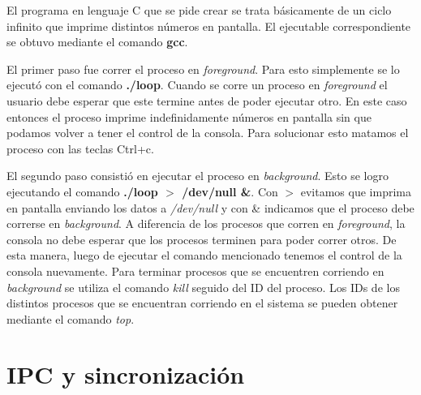 \documentclass[a4paper,11pt] {article}
\begin{document}
El programa en lenguaje C que se pide crear se trata b\'asicamente de un ciclo infinito que imprime distintos n\'umeros en pantalla. El ejecutable correspondiente se obtuvo mediante el comando \textbf{gcc}. 

El primer paso fue correr el proceso en \textit{foreground}. Para esto simplemente se lo ejecut\'o con el comando \textbf{./loop}. Cuando se corre un proceso en \textit{foreground} el usuario debe esperar que este termine antes de poder ejecutar otro. En este caso entonces el proceso imprime indefinidamente n\'umeros en pantalla sin que podamos volver a tener el control de la consola. Para solucionar esto matamos el proceso con las teclas Ctrl+c.

El segundo paso consisti\'o en ejecutar el proceso en \textit{background}. Esto se logro ejecutando el comando \textbf{./loop $>$ /dev/null \&}. Con $>$ evitamos que imprima en pantalla enviando los datos a \textit{/dev/null} y con \& indicamos que el proceso debe correrse en \textit{background}. A diferencia de los procesos que corren en \textit{foreground}, la consola no debe esperar que los procesos terminen para poder correr otros. De esta manera, luego de ejecutar el comando mencionado tenemos el control de la consola nuevamente. Para terminar procesos que se encuentren corriendo en \textit{background} se utiliza el comando \textit{kill} seguido del ID del proceso. Los IDs de los distintos procesos que se encuentran corriendo en el sistema se pueden obtener mediante el comando \textit{top}.

\section*{IPC y sincronizaci\'on}
\end{document}
